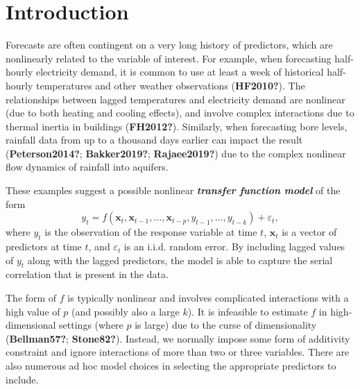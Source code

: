 \documentclass[
  11pt,
  a4paper,
]{report}
\begin{document}
\section{Introduction}\label{sec-introduction}

Forecasts are often contingent on a very long history of predictors,
which are nonlinearly related to the variable of interest. For example,
when forecasting half-hourly electricity demand, it is common to use at
least a week of historical half-hourly temperatures and other weather
observations (\textbf{HF2010?}). The relationships between lagged
temperatures and electricity demand are nonlinear (due to both heating
and cooling effects), and involve complex interactions due to thermal
inertia in buildings (\textbf{FH2012?}). Similarly, when forecasting
bore levels, rainfall data from up to a thousand days earlier can impact
the result (\textbf{Peterson2014?}; \textbf{Bakker2019?};
\textbf{Rajaee2019?}) due to the complex nonlinear flow dynamics of
rainfall into aquifers.

These examples suggest a possible nonlinear \textbf{\emph{transfer
function model}} of the form \[
 y_t = f(\bm{x}_{t}, \bm{x}_{t-1}, \dots,\bm{x}_{t-p}, y_{t-1},\dots,y_{t-k}) + \varepsilon_{t},
\] where \(y_{t}\) is the observation of the response variable at time
\(t\), \(\bm{x}_{t}\) is a vector of predictors at time \(t\), and
\(\varepsilon_{t}\) is an i.i.d. random error. By including lagged
values of \(y_{t}\) along with the lagged predictors, the model is able
to capture the serial correlation that is present in the data.

The form of \(f\) is typically nonlinear and involves complicated
interactions with a high value of \(p\) (and possibly also a large
\(k\)). It is infeasible to estimate \(f\) in high-dimensional settings
(where \(p\) is large) due to the curse of dimensionality
(\textbf{Bellman57?}; \textbf{Stone82?}). Instead, we normally impose
some form of additivity constraint and ignore interactions of more than
two or three variables. There are also numerous ad hoc model choices in
selecting the appropriate predictors to include.
\end{document}
